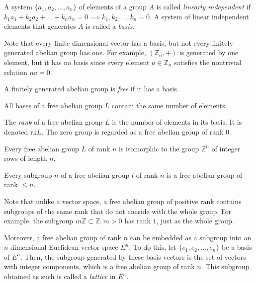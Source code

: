 \documentclass{article}
\begin{document}
  \begin{definition}
    A system $\{ a_1, a_2, ..., a_n\}$ of elements of a group $A$ is called \textit{linearly independent} if $k_1 a_1 + k_2 a_2 + ... + k_n a_n = 0 \implies k_1, k_2, ..., k_n = 0$. A system of linear independent elements that generates $A$ is called a \textit{basis}. 
  \end{definition}

  Note that every finite dimensional vector has a basis, but not every finitely generated abelian group has one. For example, $(\mathbb{Z}_n, +)$ is generated by one element, but it has no basis since every element $a \in \mathbb{Z}_n$ satisfies the nontrivial relation $n a = 0$. 

  \begin{definition}
    A finitely generated abelian group is \textit{free} if it has a basis. 
  \end{definition}

  \begin{theorem}
    All bases of a free abelian group $L$ contain the same number of elements. 
  \end{theorem}

  \begin{definition}
    The \textit{rank} of a free abelian group $L$ is the number of elements in its basis. It is denoted rk$L$. The zero group is regarded as a free abelian group of rank $0$. 
  \end{definition}

  \begin{theorem}
    Every free abelian group $L$ of rank $n$ is isomorphic to the group $\mathbb{Z}^n$ of integer rows of length $n$. 
  \end{theorem}

  \begin{theorem}
    Every subgroup $n$ of a free abelian group $l$ of rank $n$ is a free abelian group of rank $ \leq n$. 
  \end{theorem}

  Note that unlike a vector space, a free abelian group of positive rank contains subgroups of the same rank that do not conside with the whole group. For example, the subgroup $m \mathbb{Z} \subset \mathbb{Z}, m > 0$ has rank $1$, just as the whole group. 

  Moreover, a free abelian group of rank $n$ can be embedded as a subgroup into an $n$-dimensional Euclidean vector space $E^n$. To do this, let $\{e_1, e_2, ..., e_n\}$ be a basis of $E^n$. Then, the subgroup generated by these basis vectors is the set of vectors with integer components, which is a free abelian group of rank $n$. This subgroup obtained as such is called a \textit{lattice} in $E^n$. 
\end{document}
